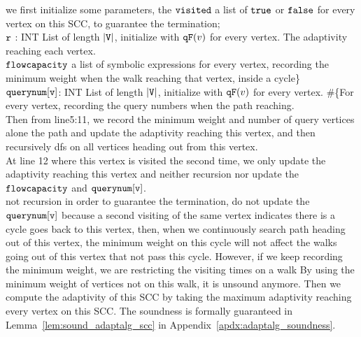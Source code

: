 we first initialize some parameters,
the $\mathtt{visited}$ a list of $\mathtt{true}$ or $\mathtt{false}$ for every vertex on this SCC, to guarantee the termination;
\\ 
$\mathtt{r}$ : INT List of length $|\mathtt{V}|$, initialize with $\mathtt{qF}(v)$ for every vertex. The adaptivity reaching each vertex.
\\ 
$\mathtt{flowcapacity}$ a list of symbolic expressions for every vertex, recording the minimum weight when the walk reaching 
that vertex, inside a cycle\}
\\ 
$\mathtt{querynum[v]}$: INT List of length $|\mathtt{V}|$, initialize with $\mathtt{qF}(v)$ for every vertex. 
\#\{For every vertex, recording the query numbers when the path reaching.
\\
Then from line5:11, we record the minimum weight and number of query vertices alone the path and update the adaptivity reaching 
this vertex, and then recursively dfs on all vertices heading out from this vertex.
\\
At line 12 where this vertex is visited the second time, 
we only update the adaptivity reaching this vertex and neither recursion nor update the $\mathtt{flowcapacity}$  and 
$\mathtt{querynum[v]}$.
\\
not recursion in order to guarantee the termination,
do not update the $\mathtt{querynum[v]}$ because a second visiting of the same vertex indicates there is a cycle goes back to this vertex, 
then, when we continuously search path heading out of this vertex, the minimum weight on this cycle will not affect the walks going out of this vertex that not pass this cycle.
However, if we keep recording the minimum weight, we are restricting the visiting times on a walk By
 using the minimum weight of vertices not on this walk, it is unsound anymore.
 Then we compute the adaptivity of this SCC by taking the maximum adaptivity reaching every vertex on this SCC.
%
The soundness is formally guaranteed in Lemma~\ref{lem:sound_adaptalg_scc} in Appendix~\ref{apdx:adaptalg_soundness}.
